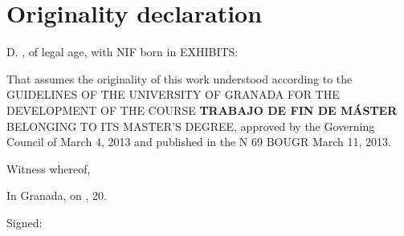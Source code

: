 \begingroup
\let\clearpage\relax
\let\cleardoublepage\relax
\let\cleardoublepage\relax

\chapter*{Originality declaration}

\vspace{6ex}
D. \underline{\hphantom{ PABLO GALINDO SALGADO }}, of legal age, with NIF \underline{\hphantom{ 70906540R}} born in \underline{\hphantom{OVIEDO(ASTURIAS) }} EXHIBITS:

\vspace{3ex}
That assumes the originality of this work understood according to the GUIDELINES OF THE UNIVERSITY OF GRANADA FOR THE DEVELOPMENT OF THE COURSE \textbf{TRABAJO DE FIN DE M\'ASTER} BELONGING TO ITS MASTER'S DEGREE, approved by the Governing Council of March 4, 2013 and published in the N 69 BOUGR March 11, 2013.

Witness whereof,


\begin{center}
In Granada, on \underline{\hphantom{June }} \underline{\hphantom{ 23}}, 20\underline{\hphantom{14b}}.





\vspace{12ex}
Signed: \underline{\hphantom{PABLO GALINDO SALGADO }}
\end{center}

\vspace{2ex}
\endgroup			

\vfill